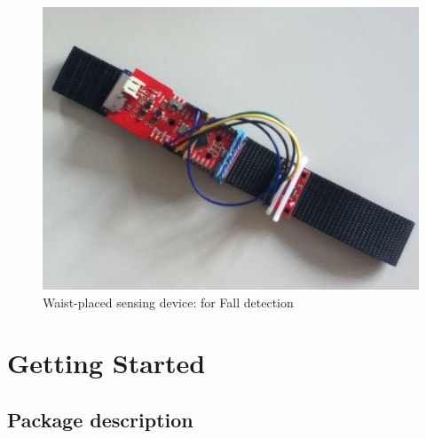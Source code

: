 \documentclass[10pt,a4paper]{report}
\begin{document}
\begin{figure}
\centering
\includegraphics[scale=0.35]{HW_waist_device.jpg}
\caption{Waist-placed sensing device: for Fall detection}
\label{fig:waist_device}
\end{figure}

\chapter{Getting Started}
\section{Package description}
\end{document}
